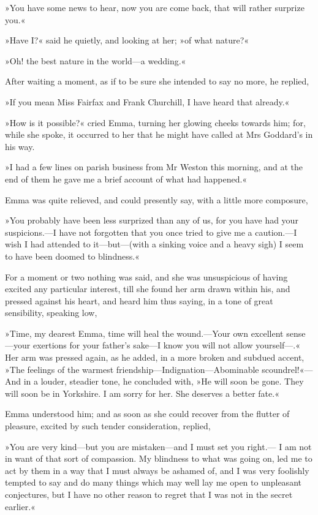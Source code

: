 »You have some news to hear, now you are come back, that will rather surprize you.«

»Have I?« said he quietly, and looking at her; »of what nature?«

»Oh! the best nature in the world—a wedding.«

After waiting a moment, as if to be sure she intended to say no more, he replied,

»If you mean Miss Fairfax and Frank Churchill, I have heard that already.«

»How is it possible?« cried Emma, turning her glowing cheeks towards him; for, while she spoke, it occurred to her that he might have called at Mrs Goddard's in his way.

»I had a few lines on parish business from Mr Weston this morning, and at the end of them he gave me a brief account of what had happened.«

Emma was quite relieved, and could presently say, with a little more composure,

»You probably have been less surprized than any of us, for you have had your suspicions.—I have not forgotten that you once tried to give me a caution.—I wish I had attended to it—but—(with a sinking voice and a heavy sigh) I seem to have been doomed to blindness.«

For a moment or two nothing was said, and she was unsuspicious of having excited any particular interest, till she found her arm drawn within his, and pressed against his heart, and heard him thus saying, in a tone of great sensibility, speaking low,

»Time, my dearest Emma, time will heal the wound.—Your own excellent sense—your exertions for your father's sake—I know you will not allow yourself—.« Her arm was pressed again, as he added, in a more broken and subdued accent, »The feelings of the warmest friendship—Indignation—Abominable scoundrel!«—And in a louder, steadier tone, he concluded with, »He will soon be gone. They will soon be in Yorkshire. I am sorry for her. She deserves a better fate.«

Emma understood him; and as soon as she could recover from the flutter of pleasure, excited by such tender consideration, replied,

»You are very kind—but you are mistaken—and I must set you right.— I am not in want of that sort of compassion. My blindness to what was going on, led me to act by them in a way that I must always be ashamed of, and I was very foolishly tempted to say and do many things which may well lay me open to unpleasant conjectures, but I have no other reason to regret that I was not in the secret earlier.«

